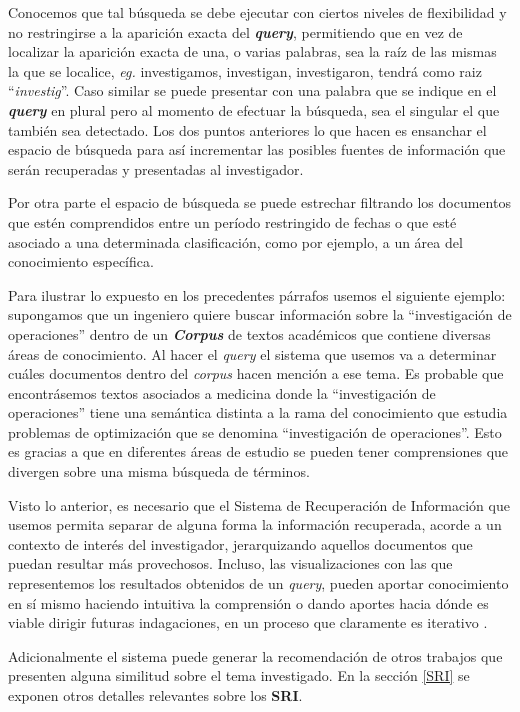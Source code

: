 \documentclass[
  10,
  spanish,
  openany]{book}
\begin{document}
Conocemos que tal búsqueda se debe ejecutar con ciertos niveles de flexibilidad y no restringirse a la aparición exacta del \textbf{\emph{query}}, permitiendo que en vez de localizar la aparición exacta de una, o varias palabras, sea la raíz de las mismas la que se localice, \emph{eg.} investigamos, investigan, investigaron, tendrá como raiz ``\emph{investig}''. Caso similar se puede presentar con una palabra que se indique en el \textbf{\emph{query}} en plural pero al momento de efectuar la búsqueda, sea el singular el que también sea detectado. Los dos puntos anteriores lo que hacen es ensanchar el espacio de búsqueda para así incrementar las posibles fuentes de información que serán recuperadas y presentadas al investigador.

Por otra parte el espacio de búsqueda se puede estrechar filtrando los documentos que estén comprendidos entre un período restringido de fechas o que esté asociado a una determinada clasificación, como por ejemplo, a un área del conocimiento específica.

Para ilustrar lo expuesto en los precedentes párrafos usemos el siguiente ejemplo: supongamos que un ingeniero quiere buscar información sobre la ``investigación de operaciones'' dentro de un \textbf{\emph{Corpus}} de textos académicos que contiene diversas áreas de conocimiento. Al hacer el \emph{query} el sistema que usemos va a determinar cuáles documentos dentro del \emph{corpus} hacen mención a ese tema. Es probable que encontrásemos textos asociados a medicina donde la ``investigación de operaciones'' tiene una semántica distinta a la rama del conocimiento que estudia problemas de optimización que se denomina ``investigación de operaciones''. Esto es gracias a que en diferentes áreas de estudio se pueden tener comprensiones que divergen sobre una misma búsqueda de términos.

Visto lo anterior, es necesario que el Sistema de Recuperación de Información que usemos permita separar de alguna forma la información recuperada, acorde a un contexto de interés del investigador, jerarquizando aquellos documentos que puedan resultar más provechosos. Incluso, las visualizaciones con las que representemos los resultados obtenidos de un \emph{query}, pueden aportar conocimiento en sí mismo haciendo intuitiva la comprensión \citep{zhang2008} o dando aportes hacia dónde es viable dirigir futuras indagaciones, en un proceso que claramente es iterativo \citep{zhai2016}.

Adicionalmente el sistema puede generar la recomendación de otros trabajos \citep{aggarwal2018} que presenten alguna similitud sobre el tema investigado. En la sección \ref{SRI} se exponen otros detalles relevantes sobre los \textbf{SRI}.
\end{document}
